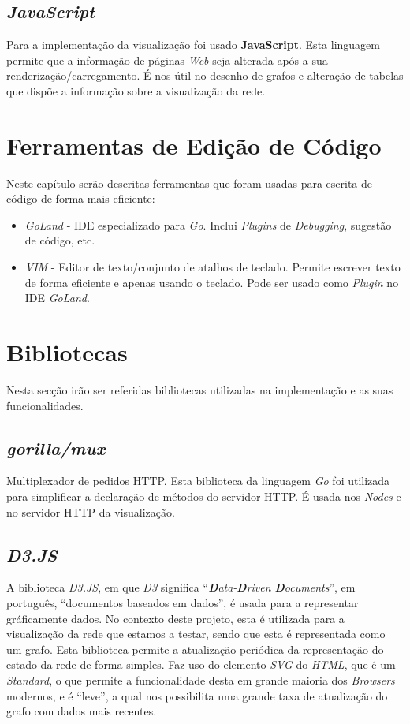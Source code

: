 \subsection{\emph{JavaScript}}
Para a implementação da visualização foi usado \textbf{JavaScript}.
Esta linguagem permite que a informação de páginas \emph{Web} seja alterada após a sua renderização/carregamento.
É nos útil no desenho de grafos e alteração de tabelas que dispõe a informação sobre a visualização da rede.



\section{Ferramentas de Edição de Código}
Neste capítulo serão descritas ferramentas que foram usadas para escrita de código de forma mais eficiente:
\begin{itemize}
    \item \emph{GoLand} - \acs{IDE} especializado para \emph{Go}. Inclui \emph{Plugins} de \emph{Debugging}, sugestão de código, etc.
    \item \emph{VIM} - Editor de texto/conjunto de atalhos de teclado. Permite escrever texto de forma eficiente e apenas usando o teclado. Pode ser usado como \emph{Plugin} no \acs{IDE} \emph{GoLand}.
\end{itemize}

\section{Bibliotecas}
\label{chap3:bibliotecas}
Nesta secção irão ser referidas bibliotecas utilizadas na implementação e as suas funcionalidades.

\subsection{\emph{gorilla/mux}}
Multiplexador de pedidos \acs{HTTP}. Esta biblioteca da linguagem \emph{Go} foi utilizada para simplificar a declaração de métodos do servidor \acs{HTTP}. É usada nos \emph{Nodes} e no servidor \acs{HTTP} da visualização.

\subsection{\emph{D3.JS}}
A biblioteca \emph{D3.JS}, em que \emph{D3} significa ``\emph{\textbf{D}ata-\textbf{D}riven \textbf{D}ocuments}'', em português, ``documentos baseados em dados'', é usada para a representar gráficamente dados.
No contexto deste projeto, esta é utilizada para a visualização da rede que estamos a testar, sendo que esta é representada como um grafo.
Esta biblioteca permite a atualização periódica da representação do estado da rede de forma simples.
Faz uso do elemento \emph{\acs{SVG}} do \emph{\acs{HTML}}, que é um \emph{Standard}, o que permite a funcionalidade desta em grande maioria dos \emph{Browsers} modernos, e é ``leve'', a qual nos possibilita uma grande taxa de atualização do grafo com dados mais recentes.

